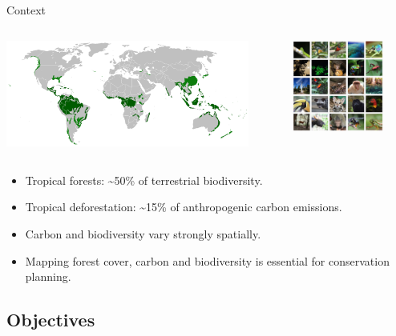 \documentclass[10pt,table,dvipsnames,compress]{beamer}
\begin{document}
\begin{frame}[label={sec:org93a3074}]{Context}
\begin{columns}
\begin{column}{0.7\columnwidth}
\begin{center}
\includegraphics[width=8cm]{figs/rain_forests_map.png}
\end{center}
\end{column}

\begin{column}{0.3\columnwidth}
\begin{center}
\includegraphics[width=3cm]{figs/tropical_forest_biodiv.png}
\end{center}
\end{column}
\end{columns}


\begin{itemize}
\item Tropical forests: \textasciitilde{}50\% of terrestrial biodiversity.
\item Tropical deforestation: \textasciitilde{}15\% of anthropogenic carbon emissions.
\item Carbon and biodiversity vary strongly spatially.
\item Mapping forest cover, carbon and biodiversity is essential for conservation planning.
\end{itemize}
\end{frame}

\subsection{Objectives}
\label{sec:org177caed}
\end{document}
